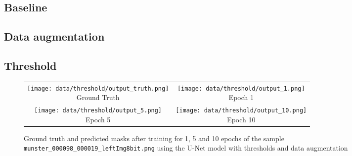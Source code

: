 \subsection{Baseline}

\begin{figure}
    
\end{figure}

\subsection{Data augmentation}

\subsection{Threshold}
\begin{figure}
    \centering
    \begin{tabular}{cc}
        \makecell{
            \texttt{[image: data/threshold/output\_truth.png]} \\
            Ground Truth 
        } &
        \makecell{
            \texttt{[image: data/threshold/output\_1.png]} \\
            Epoch 1
        } \\
        \makecell{
            \texttt{[image: data/threshold/output\_5.png]} \\
            Epoch 5
        } &
        \makecell {
            \texttt{[image: data/threshold/output\_10.png]} \\
            Epoch 10
        } \\ 
        
    \end{tabular}
    \caption{Ground truth and predicted masks after training for 1, 5 and 10 epochs of the sample \texttt{munster\_000098\_000019\_leftImg8bit.png} using the U-Net model with thresholds and data augmentation}    
\end{figure}

